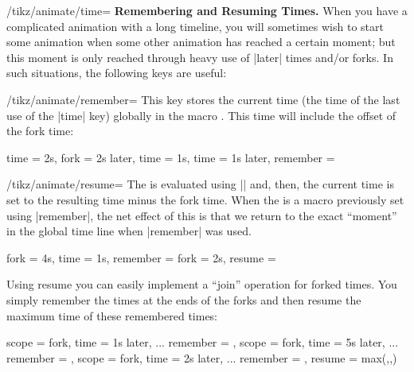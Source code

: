 \begin{key}{/tikz/animate/time=}
    \medskip\textbf{Remembering and Resuming Times.}
    When you have a complicated animation with a long timeline, you will
    sometimes wish to start some animation when some other animation has
    reached a certain moment; but this moment is only reached through heavy use
    of |later| times and/or forks. In such situations, the following keys are
    useful:
    \begin{key}{/tikz/animate/remember=}
        This key stores the current time (the time of the last use of the
        |time| key) globally in the macro . This time will
        include the offset of the fork time:
\begin{codeexample}
time = 2s,
fork = 2s later,    %
time = 1s,          %
time = 1s later,    %
remember = \mytime  %
\end{codeexample}
    \end{key}
    \begin{key}{/tikz/animate/resume=}
        The  is evaluated using |\pgfparsetime| and, then,
        the current time is set to the resulting time minus the fork time. When
        the  is a macro previously set using |remember|,
        the net effect of this is that we return to the exact ``moment'' in the
        global time line when |remember| was used.
\begin{codeexample}
fork = 4s,
time = 1s,
remember = \mytime  %
fork = 2s,          %
resume   = \mytime  %
\end{codeexample}
        Using resume you can easily implement a ``join'' operation for forked
        times. You simply remember the times at the ends of the forks and then
        resume the maximum time of these remembered times:
\begin{codeexample}
scope = {
  fork,
  time = 1s later,
  ...
  remember = \forka
},
scope = {
  fork,
  time = 5s later,
  ...
  remember = \forkb
},
scope = {
  fork,
  time = 2s later,
  ...
  remember = \forkc
},
resume = {max(\forka,\forkb,\forkc)} %
\end{codeexample}
    \end{key}
\end{key}


